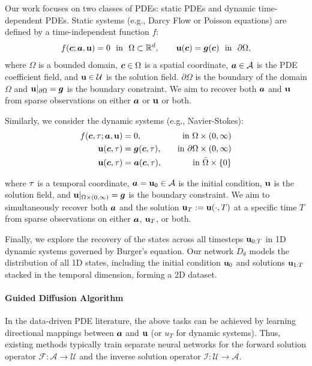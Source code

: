 Our work focuses on two classes of PDEs: static PDEs and dynamic time-dependent PDEs. Static systems (e.g., Darcy Flow or Poisson equations) are defined by a time-independent function $f$:
\begin{equation}\label{eq:static}
    \begin{aligned}
        f(\boldsymbol{c};\boldsymbol{a},\mathbf{u})=0~\text{ in }~\Omega\subset\mathbb{R}^d, \quad\quad 
        \mathbf{u}(\boldsymbol{c})=\boldsymbol{g}(\boldsymbol{c})~\text{ in }~\partial \Omega,
    \end{aligned}
\end{equation}
where $\Omega$ is a bounded domain, $\boldsymbol{c}\in\Omega$ is a spatial coordinate, $\boldsymbol{a}\in\mathcal{A}$ is the PDE coefficient field, and $\mathbf{u}\in\mathcal{U}$ is the solution field. $\partial \Omega$ is the boundary of the domain $\Omega$ and $\mathbf{u}|_{\partial\Omega} = \boldsymbol{g}$ is the boundary constraint. We aim to recover both $\boldsymbol{a}$ and $\mathbf{u}$ from sparse observations on either $\boldsymbol{a}$ or $\mathbf{u}$ or both. 

Similarly, we consider the dynamic systems (e.g., Navier-Stokes):
\begin{equation}\label{eq:dynamic}
\begin{aligned}
    f(\boldsymbol{c},\tau;\boldsymbol{a},\mathbf{u})&=0, \quad&\text{in } \Omega \times (0,\infty) \\
    \mathbf{u}(\boldsymbol{c},\tau) &= \boldsymbol{g}(\boldsymbol{c},\tau), \quad&\text{in } \partial \Omega \times (0,\infty) \\
    \mathbf{u}(\boldsymbol{c},\tau) &= \boldsymbol{a}(\boldsymbol{c},\tau), \quad&\text{in } \bar{\Omega} \times \{0\}
\end{aligned}
\end{equation}

where $\tau$ is a temporal coordinate, $\boldsymbol{a}=\mathbf{u}_0\in\mathcal{A}$ is the initial condition, $\mathbf{u}$ is the solution field, and $\mathbf{u}|_{\Omega\times(0,\infty)} = \boldsymbol{g}$ is the boundary constraint. We aim to simultaneously recover both $\boldsymbol{a}$ and the solution $\mathbf{u}_T := \mathbf{u}(\cdot, T)$ at a specific time $T$ from sparse observations on either $\boldsymbol{a}$, $\mathbf{u}_T$, or both.  



Finally, we explore the recovery of the states across all timesteps $\mathbf{u}_{0:T}$ in 1D dynamic systems governed by Burger's equation. Our network $D_\theta$ models the distribution of all 1D states, including the initial condition $\mathbf{u}_0$ and solutions $\mathbf{u}_{1:T}$ stacked in the temporal dimension, forming a 2D dataset.

\paragraph{Guided Diffusion Algorithm}
In the data-driven PDE literature, the above tasks can be achieved by learning directional mappings between $\boldsymbol{a}$ and $\mathbf{u}$ (or $u_T$ for dynamic systems). Thus, existing methods typically train separate neural networks for the forward solution operator $\mathcal{F}:\mathcal{A}\rightarrow \mathcal{U}$ and the inverse solution operator $\mathcal{I}:\mathcal{U}\rightarrow \mathcal{A}$.


